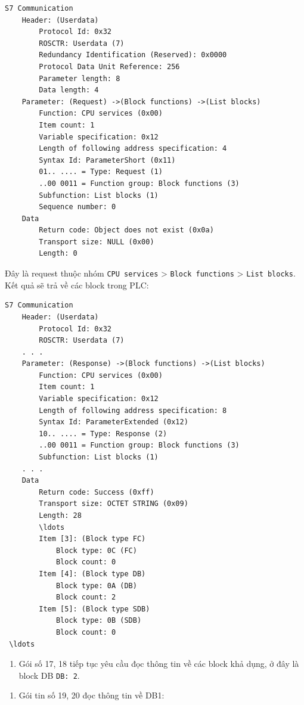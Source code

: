 \documentclass[../main.tex]{subfiles}
\begin{document}
\begin{enumerate}
\begin{verbatim}
S7 Communication
    Header: (Userdata)
        Protocol Id: 0x32
        ROSCTR: Userdata (7)
        Redundancy Identification (Reserved): 0x0000
        Protocol Data Unit Reference: 256
        Parameter length: 8
        Data length: 4
    Parameter: (Request) ->(Block functions) ->(List blocks)
        Function: CPU services (0x00)
        Item count: 1
        Variable specification: 0x12
        Length of following address specification: 4
        Syntax Id: ParameterShort (0x11)
        01.. .... = Type: Request (1)
        ..00 0011 = Function group: Block functions (3)
        Subfunction: List blocks (1)
        Sequence number: 0
    Data
        Return code: Object does not exist (0x0a)
        Transport size: NULL (0x00)
        Length: 0
\end{verbatim}


Đây là request thuộc nhóm \texttt{CPU services} > \texttt{Block functions} > \texttt{List blocks}. Kết quả sẽ trả về các block trong PLC:


\begin{verbatim}
S7 Communication
    Header: (Userdata)
        Protocol Id: 0x32
        ROSCTR: Userdata (7)
    . . .
    Parameter: (Response) ->(Block functions) ->(List blocks)
        Function: CPU services (0x00)
        Item count: 1
        Variable specification: 0x12
        Length of following address specification: 8
        Syntax Id: ParameterExtended (0x12)
        10.. .... = Type: Response (2)
        ..00 0011 = Function group: Block functions (3)
        Subfunction: List blocks (1)
    . . .
    Data
        Return code: Success (0xff)
        Transport size: OCTET STRING (0x09)
        Length: 28
        \ldots
        Item [3]: (Block type FC)
            Block type: 0C (FC)
            Block count: 0
        Item [4]: (Block type DB)
            Block type: 0A (DB)
            Block count: 2
        Item [5]: (Block type SDB)
            Block type: 0B (SDB)
            Block count: 0
 \ldots
\end{verbatim}


\begin{enumerate}
    \item Gói số 17, 18 tiếp tục yêu cầu đọc thông tin về các block khả dụng, ở đây là block DB \texttt{DB: 2}.
\end{enumerate}


\begin{enumerate}
    \item Gói tin số 19, 20 đọc thông tin về DB1:
\end{enumerate}



\end{enumerate}
\end{document}
